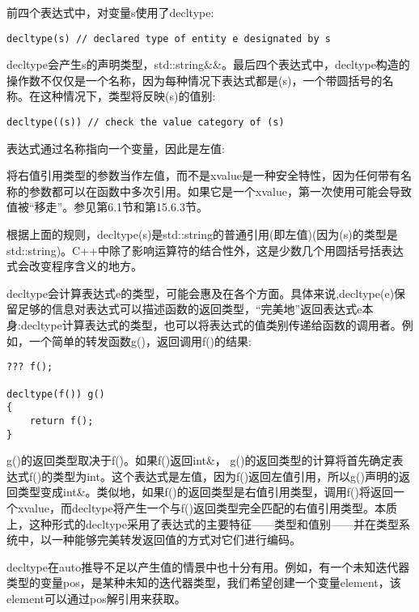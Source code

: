前四个表达式中，对变量s使用了decltype:

\begin{lstlisting}[style=styleCXX]
decltype(s) // declared type of entity e designated by s
\end{lstlisting}

decltype会产生s的声明类型，std::string\&\&。最后四个表达式中，decltype构造的操作数不仅仅是一个名称，因为每种情况下表达式都是(s)，一个带圆括号的名称。在这种情况下，类型将反映(s)的值别:

\begin{lstlisting}[style=styleCXX]
decltype((s)) // check the value category of (s)
\end{lstlisting}

表达式通过名称指向一个变量，因此是左值:

\begin{tcolorbox}[colback=webgreen!5!white,colframe=webgreen!75!black]
\hspace*{0.75cm}将右值引用类型的参数当作左值，而不是xvalue是一种安全特性，因为任何带有名称的参数都可以在函数中多次引用。如果它是一个xvalue，第一次使用可能会导致值被“移走”。参见第6.1节和第15.6.3节。
\end{tcolorbox}

根据上面的规则，decltype(s)是std::string的普通引用(即左值)(因为(s)的类型是std::string)。C++中除了影响运算符的结合性外，这是少数几个用圆括号括表达式会改变程序含义的地方。

decltype会计算表达式e的类型，可能会惠及在各个方面。具体来说,decltype(e)保留足够的信息对表达式可以描述函数的返回类型，“完美地”返回表达式e本身:decltype计算表达式的类型，也可以将表达式的值类别传递给函数的调用者。例如，一个简单的转发函数g()，返回调用f()的结果:

\begin{lstlisting}[style=styleCXX]
??? f();

decltype(f()) g()
{
	return f();
}
\end{lstlisting}

g()的返回类型取决于f()。如果f()返回int\&， g()的返回类型的计算将首先确定表达式f()的类型为int。这个表达式是左值，因为f()返回左值引用，所以g()声明的返回类型变成int\&。类似地，如果f()的返回类型是右值引用类型，调用f()将返回一个xvalue，而decltype将产生一个与f()返回类型完全匹配的右值引用类型。本质上，这种形式的decltype采用了表达式的主要特征——类型和值别——并在类型系统中，以一种能够完美转发返回值的方式对它们进行编码。

decltype在auto推导不足以产生值的情景中也十分有用。例如，有一个未知迭代器类型的变量pos，是某种未知的迭代器类型，我们希望创建一个变量element，该element可以通过pos解引用来获取。


